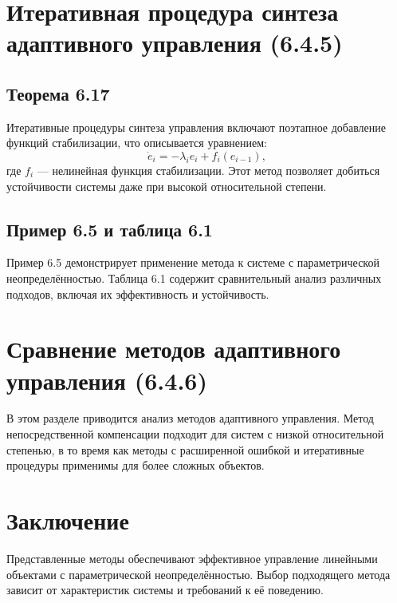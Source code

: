 \documentclass[a4paper,14pt]{extarticle} %
\begin{document}
\section{Итеративная процедура синтеза адаптивного управления (6.4.5)}

\subsection{Теорема 6.17}
Итеративные процедуры синтеза управления включают поэтапное добавление функций стабилизации, что описывается уравнением:
\[
\dot{e}_i = -\lambda_i e_i + f_i(e_{i-1}),
\]
где \( f_i \) — нелинейная функция стабилизации. Этот метод позволяет добиться устойчивости системы даже при высокой относительной степени.

\subsection{Пример 6.5 и таблица 6.1}
Пример 6.5 демонстрирует применение метода к системе с параметрической неопределённостью. Таблица 6.1 содержит сравнительный анализ различных подходов, включая их эффективность и устойчивость.

\section{Сравнение методов адаптивного управления (6.4.6)}
В этом разделе приводится анализ методов адаптивного управления. Метод непосредственной компенсации подходит для систем с низкой относительной степенью, в то время как методы с расширенной ошибкой и итеративные процедуры применимы для более сложных объектов.

\section*{Заключение}
Представленные методы обеспечивают эффективное управление линейными объектами с параметрической неопределённостью. Выбор подходящего метода зависит от характеристик системы и требований к её поведению.
\end{document}
